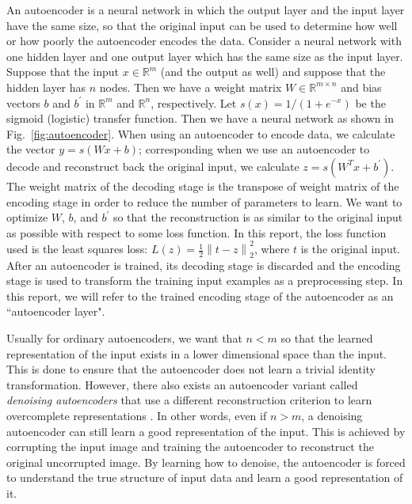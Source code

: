 \documentclass[conference]{IEEEtran}
\newcommand{\norm}[1]{\left\lVert #1 \right\rVert}
\begin{document}
An autoencoder is a neural network in which the output layer and the input layer have the same size,
so that the original input can be used to determine how well or how poorly the autoencoder encodes the data. Consider a 
neural network with one hidden layer and one output layer which has the same size as the input layer. Suppose
that the input $x\in\mathbb{R}^m$ (and the output as well) and suppose that the hidden layer has $n$ nodes. Then we
have a weight matrix $W\in\mathbb{R}^{m\times n}$ and bias vectors $b$ and $b^{'}$ in $\mathbb{R}^m$ and $\mathbb{R}^n$, respectively.
Let $s(x) = 1/(1+e^{-x})$ be the sigmoid (logistic) transfer function. Then we have a neural network as shown in Fig.~\ref{fig:autoencoder}. When using an autoencoder to encode data, we calculate the vector $y=s(Wx + b)$; corresponding when we use an autoencoder to decode and reconstruct back the original input, we calculate $z=s(W^{T}x+b^{'})$. The weight matrix of the decoding stage is the transpose of weight matrix of the encoding stage in order to reduce the number of parameters to learn. We want to optimize $W$, $b$, and $b^{'}$ so that the reconstruction is as similar to the original input as possible with respect to some loss function. In this report, the loss function used is the least squares loss: $L(z)=\frac{1}{2}\norm{t-z}_2^2$, where $t$ is the original input. After an autoencoder is trained, its decoding stage is discarded and the encoding stage is used to transform the training input examples as a preprocessing step. In this report, we will refer to the trained encoding stage of the autoencoder as an ``autoencoder layer".  

Usually for ordinary autoencoders, we want that $n<m$ so that the learned representation of the input exists in a lower dimensional space than the input. This is done to ensure that the autoencoder does not learn a trivial identity transformation. However, there also exists an autoencoder variant called \textit{denoising autoencoders} that use a different reconstruction criterion to learn overcomplete representations \cite{vincent2010stacked}. In other words, even if $n>m$, a denoising autoencoder can still learn a good representation of the input. This is achieved by corrupting the input image and training the autoencoder to reconstruct the original uncorrupted image. By learning how to denoise, the autoencoder is forced to understand the true structure of input data and learn a good representation of it. 
\end{document}
